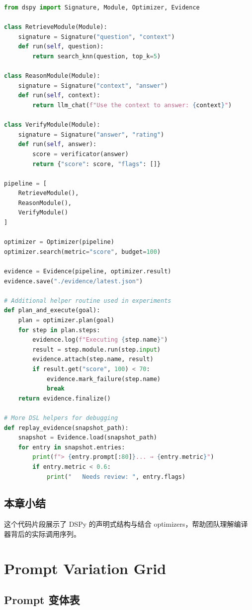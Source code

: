 \documentclass[a4paper]{article}
\begin{document}
\begin{lstlisting}[language=Python]
from dspy import Signature, Module, Optimizer, Evidence

class RetrieveModule(Module):
    signature = Signature("question", "context")
    def run(self, question):
        return search_knn(question, top_k=5)

class ReasonModule(Module):
    signature = Signature("context", "answer")
    def run(self, context):
        return llm_chat(f"Use the context to answer: {context}")

class VerifyModule(Module):
    signature = Signature("answer", "rating")
    def run(self, answer):
        score = verificator(answer)
        return {"score": score, "flags": []}

pipeline = [
    RetrieveModule(),
    ReasonModule(),
    VerifyModule()
]

optimizer = Optimizer(pipeline)
optimizer.search(metric="score", budget=100)

evidence = Evidence(pipeline, optimizer.result)
evidence.save("./evidence/latest.json")

# Additional helper routine used in experiments
def plan_and_execute(goal):
    plan = optimizer.plan(goal)
    for step in plan.steps:
        evidence.log(f"Executing {step.name}")
        result = step.module.run(step.input)
        evidence.attach(step.name, result)
        if result.get("score", 100) < 70:
            evidence.mark_failure(step.name)
            break
    return evidence.finalize()

# More DSL helpers for debugging
def replay_evidence(snapshot_path):
    snapshot = Evidence.load(snapshot_path)
    for entry in snapshot.entries:
        print(f"> {entry.prompt[:80]}... → {entry.metric}")
        if entry.metric < 0.6:
            print("   Needs review: ", entry.flags)
\end{lstlisting}

\subsection{本章小结}

这个代码片段展示了 DSPy 的声明式结构与结合 optimizers，帮助团队理解编译器背后的实际调用序列。

\section{Prompt Variation Grid}

\subsection{Prompt 变体表}
\end{document}
